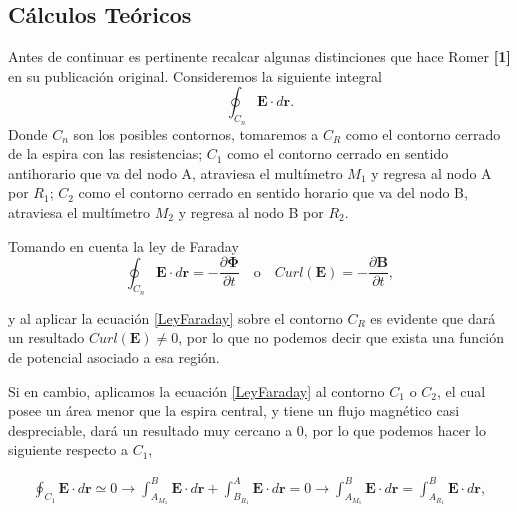 \documentclass[a0,portrait]{a0poster}
\begin{document}
\begin{multicols}{2}

\color{Black} %

\section*{Cálculos Teóricos}

\noindent Antes de continuar es pertinente recalcar algunas distinciones que hace Romer \textbf{[{1}]} en su publicación original.
Consideremos la siguiente integral
\begin{equation}
    \oint_{C_n} \mathbf{E} \cdot d\mathbf{r}.
\end{equation}
Donde $C_n$ son los posibles contornos, tomaremos a $C_R$  como el contorno cerrado de la espira con las resistencias; $C_1$  como el contorno cerrado en sentido antihorario que va del nodo A, atraviesa el multímetro $M_1$ y regresa al nodo A por $R_1$; $C_2$  como el contorno cerrado en sentido horario que va del nodo B, atraviesa el multímetro $M_2$ y regresa al nodo B por $R_2$.



\noindent Tomando en cuenta la ley de Faraday 
\begin{equation}
    \oint_{C_n}  \mathbf{E} \cdot d\mathbf{r}=-\frac{\partial \boldsymbol{\Phi} }{\partial t} \quad \text{o}\quad Curl(\mathbf{E}) =-\frac{\partial \mathbf{B}}{\partial t},
    \label{LeyFaraday}
\end{equation}

\noindent y al aplicar la ecuación \ref{LeyFaraday} sobre el contorno $C_R$ es evidente que dará un resultado $Curl(\mathbf{E}) \neq 0 $, por lo que no podemos decir que exista una función de potencial asociado a esa región.

Si en cambio, aplicamos la ecuación \ref{LeyFaraday} al contorno $C_1$ o  $C_2$, el cual posee un área menor que la espira central, y tiene un flujo magnético casi despreciable, dará un resultado muy cercano a 0, por lo que podemos hacer lo siguiente respecto a $C_1$,  

\begin{equation}
    \begin{split}
        \oint_{C_1} \mathbf{E} \cdot d\mathbf{r}  \simeq  0 \longrightarrow \int_{A_{M_1}}^{B} \mathbf{E} \cdot d\mathbf{r}+ \int_{B_{R_1}}^{A} \mathbf{E} \cdot d\mathbf{r}=0   \longrightarrow \int_{A_{M_1}}^{B} \mathbf{E} \cdot d\mathbf{r} = \int_{A_{R_1}}^{B} \mathbf{E} \cdot d\mathbf{r},
    \end{split}
    \label{integralCerrada}
\end{equation}


\end{multicols}
\end{document}
